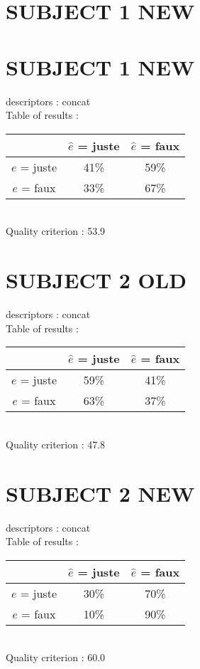 \section*{SUBJECT 1 NEW}
\newpage
\section*{SUBJECT 1 NEW}
descriptors : concat \\
Table of results : \\
\begin{tabular}{|c|c|c|}
\hline				& $\hat{e}$ = juste & $\hat{e}$ = faux \\
\hline  $e$ = juste	&     41\%			&     59\%		\\
\hline  $e$ = faux	&     33\%			&     67\%		\\
\hline
\end{tabular}\\
Quality criterion :   53.9 \\

\newpage
\section*{SUBJECT 2 OLD}
descriptors : concat \\
Table of results : \\
\begin{tabular}{|c|c|c|}
\hline				& $\hat{e}$ = juste & $\hat{e}$ = faux \\
\hline  $e$ = juste	&     59\%			&     41\%		\\
\hline  $e$ = faux	&     63\%			&     37\%		\\
\hline
\end{tabular}\\
Quality criterion :   47.8 \\

\newpage
\section*{SUBJECT 2 NEW}
descriptors : concat \\
Table of results : \\
\begin{tabular}{|c|c|c|}
\hline				& $\hat{e}$ = juste & $\hat{e}$ = faux \\
\hline  $e$ = juste	&     30\%			&     70\%		\\
\hline  $e$ = faux	&     10\%			&     90\%		\\
\hline
\end{tabular}\\
Quality criterion :   60.0 \\

